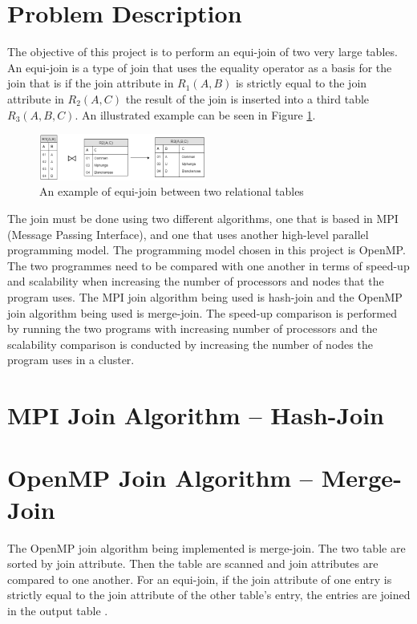 \documentclass[journal,draftclsnofoot]{IEEEtran}
\begin{document}
\section{Problem Description}\label{prob}
The objective of this project is to perform an equi-join of two very large tables. An equi-join is a type of join that uses the equality operator as a basis for the join \cite{w3resource.com2018} that is if the join attribute in $R_{1}(A,B)$ is strictly equal to the join attribute in $R_{2}(A,C)$ the result of the join is inserted into a third table $R_{3}(A, B, C)$. An illustrated example can be seen in Figure \ref{fig:Equi-Join}.
\begin{figure}[htbp]
	\centering
		\includegraphics[width=0.4882\textwidth]{Equi-Join.png}
	\caption{An example of equi-join between two relational tables}
	\label{fig:Equi-Join}
\end{figure}
The join must be done using two different algorithms, one that is based in MPI (Message Passing Interface), and one that uses another high-level parallel programming model. The programming model chosen in this project is OpenMP. The two programmes need to be compared with one another in terms of speed-up and scalability when increasing the number of processors and nodes that the program uses. The MPI join algorithm being used is hash-join and the OpenMP join algorithm being used is merge-join. The speed-up comparison is performed by running the two programs with increasing number of processors and the scalability comparison is conducted by increasing the number of nodes the program uses in a cluster.

\section{MPI Join Algorithm -- Hash-Join}\label{mpi}
\section{OpenMP Join Algorithm -- Merge-Join}\label{omp}
The OpenMP join algorithm being implemented is merge-join. The two table are sorted by join attribute. Then the table are scanned and join attributes are compared to one another. For an equi-join, if the join attribute of one entry is strictly equal to the join attribute of the other table's entry, the entries are joined in the output table \cite{Pavlo2017}. 
\end{document}
